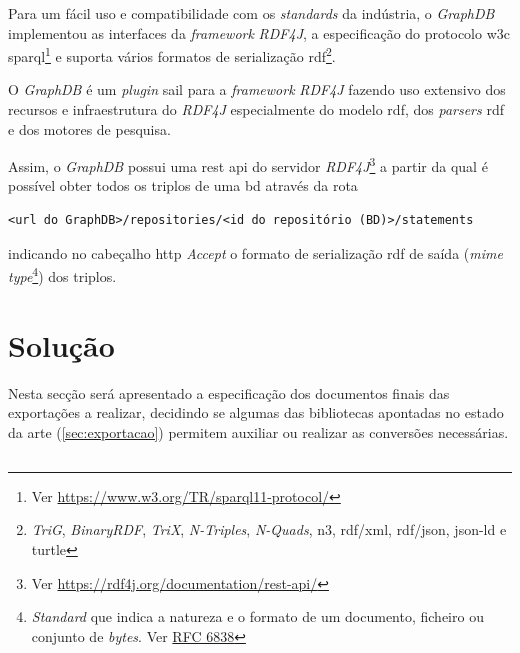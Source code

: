 Para um fácil uso e compatibilidade com os \textit{standards} da indústria, o \textit{GraphDB} implementou as interfaces da \textit{framework} \textit{RDF4J}, a especificação do protocolo \acrshort{w3c} \acrshort{sparql}\footnote{Ver \url{https://www.w3.org/TR/sparql11-protocol/}} e suporta vários formatos de serialização \acrshort{rdf}\footnote{\label{fnRDF}\textit{TriG}, \textit{BinaryRDF}, \textit{TriX}, \textit{N-Triples}, \textit{N-Quads}, \acrshort{n3}, \acrshort{rdf}/\acrshort{xml}, \acrshort{rdf}/\acrshort{json}, \acrshort{json-ld} e \acrshort{turtle}}.~\cite{graphdbAbout}

O \textit{GraphDB} é um \textit{plugin} \acrshort{sail} para a \textit{framework} \textit{RDF4J} fazendo uso extensivo dos recursos e infraestrutura do \textit{RDF4J} especialmente do modelo \acrshort{rdf}, dos \textit{parsers} \acrshort{rdf} e dos motores de pesquisa.~\cite{graphdbArch}

Assim, o \textit{GraphDB} possui uma \acrshort{rest} \acrshort{api} do servidor \textit{RDF4J}\footnote{Ver \url{https://rdf4j.org/documentation/rest-api/}} a partir da qual é possível obter todos os triplos de uma \acrshort{bd} através da rota
\begin{verbatim}
<url do GraphDB>/repositories/<id do repositório (BD)>/statements
\end{verbatim}
indicando no cabeçalho \acrshort{http} \textit{Accept} o formato de serialização \acrshort{rdf} de saída (\textit{\acrshort{mime} type}\footnote{\textit{Standard} que indica a natureza e o formato de um documento, ficheiro ou conjunto de \textit{bytes}. Ver \href{https://tools.ietf.org/html/rfc6838}{RFC 6838}}) dos triplos.

\section{Solução}

Nesta secção será apresentado a especificação dos documentos finais das exportações a realizar, 
decidindo se algumas das bibliotecas apontadas no estado da arte (\ref{sec:exportacao}) permitem auxiliar 
ou realizar as conversões necessárias.

\subsection{}

